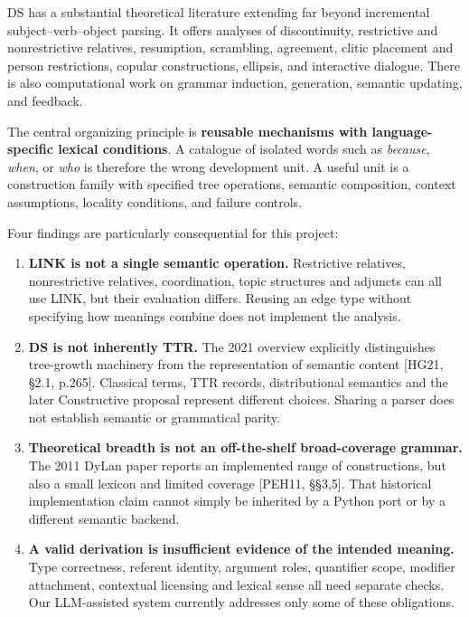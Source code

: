 \documentclass[11pt,a4paper]{article}
\providecommand{\tightlist}{\setlength{\itemsep}{2pt}\setlength{\parskip}{0pt}}
\begin{document}
DS has a substantial theoretical literature extending far beyond
incremental subject--verb--object parsing. It offers analyses of
discontinuity, restrictive and nonrestrictive relatives, resumption,
scrambling, agreement, clitic placement and person restrictions, copular
constructions, ellipsis, and interactive dialogue. There is also
computational work on grammar induction, generation, semantic updating,
and feedback.

The central organizing principle is \textbf{reusable mechanisms with
language-specific lexical conditions}. A catalogue of isolated words
such as \emph{because}, \emph{when}, or \emph{who} is therefore the
wrong development unit. A useful unit is a construction family with
specified tree operations, semantic composition, context assumptions,
locality conditions, and failure controls.

Four findings are particularly consequential for this project:

\begin{enumerate}
\def\labelenumi{\arabic{enumi}.}
\tightlist
\item
  \textbf{LINK is not a single semantic operation.} Restrictive
  relatives, nonrestrictive relatives, coordination, topic structures
  and adjuncts can all use LINK, but their evaluation differs. Reusing
  an edge type without specifying how meanings combine does not
  implement the analysis.
\item
  \textbf{DS is not inherently TTR.} The 2021 overview explicitly
  distinguishes tree-growth machinery from the representation of
  semantic content {[}HG21, §2.1, p.265{]}. Classical terms, TTR
  records, distributional semantics and the later Constructive proposal
  represent different choices. Sharing a parser does not establish
  semantic or grammatical parity.
\item
  \textbf{Theoretical breadth is not an off-the-shelf broad-coverage
  grammar.} The 2011 DyLan paper reports an implemented range of
  constructions, but also a small lexicon and limited coverage {[}PEH11,
  §§3,5{]}. That historical implementation claim cannot simply be
  inherited by a Python port or by a different semantic backend.
\item
  \textbf{A valid derivation is insufficient evidence of the intended
  meaning.} Type correctness, referent identity, argument roles,
  quantifier scope, modifier attachment, contextual licensing and
  lexical sense all need separate checks. Our LLM-assisted system
  currently addresses only some of these obligations.
\end{enumerate}
\end{document}
